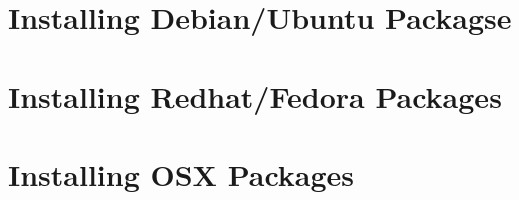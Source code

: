 \section{Installing Debian/Ubuntu Packagse}

\section{Installing Redhat/Fedora Packages}

\section{Installing OSX Packages}

